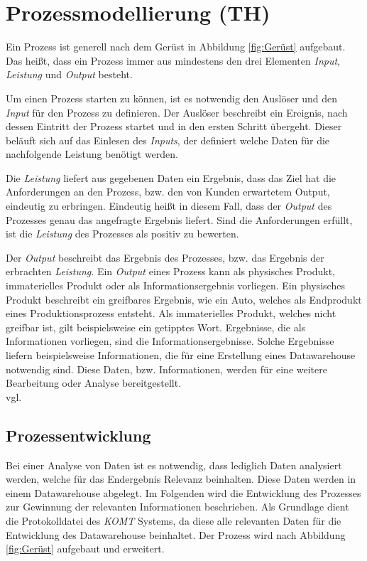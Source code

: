 
\section{Prozessmodellierung (TH)}\label{sec:Prozessmodellierung}

	
	Ein Prozess ist generell nach dem Gerüst in Abbildung \ref{fig:Gerüst} aufgebaut.
	Das heißt, dass ein Prozess immer aus mindestens den drei Elementen \textit{Input}, \textit{Leistung} und \textit{Output} besteht.
	
	Um einen Prozess starten zu können, ist es notwendig den Auslöser und den \textit{Input} für den Prozess zu definieren.
	Der Auslöser beschreibt ein Ereignis, nach dessen Eintritt der Prozess startet und in den ersten Schritt übergeht.
	Dieser beläuft sich auf das Einlesen des \textit{Inputs}, der definiert welche Daten für die nachfolgende Leistung benötigt werden.
	
	Die \textit{Leistung} liefert aus gegebenen Daten ein Ergebnis, dass das Ziel hat die Anforderungen an den Prozess, bzw. den von Kunden erwartetem Output, eindeutig zu erbringen.
	Eindeutig heißt in diesem Fall, dass der \textit{Output} des Prozesses genau das angefragte Ergebnis liefert.
	Sind die Anforderungen erfüllt, ist die \textit{Leistung} des Prozesses als positiv zu bewerten. 

	Der \textit{Output} beschreibt das Ergebnis des Prozesses, bzw. das Ergebnis der erbrachten \textit{Leistung}.
	Ein \textit{Output} eines Prozess kann als physisches Produkt, immaterielles Produkt oder als Informationsergebnis vorliegen.
	Ein physisches Produkt beschreibt ein greifbares Ergebnis, wie ein Auto, welches als Endprodukt eines Produktionsprozess entsteht.
	Als immaterielles Produkt, welches nicht greifbar ist, gilt beispielsweise ein getipptes Wort.
	Ergebnisse, die als Informationen vorliegen, sind die Informationsergebnisse. 
	Solche Ergebnisse liefern beispielsweise Informationen, die für eine Erstellung eines Datawarehouse notwendig sind.
	Diese Daten, bzw. Informationen, werden für eine weitere Bearbeitung oder Analyse bereitgestellt.
	\\vgl. \citep{Knuppertz2012}
		
	
	\subsection{Prozessentwicklung}
 	 	Bei einer Analyse von Daten ist es notwendig, dass lediglich Daten analysiert werden, welche für das Endergebnis Relevanz beinhalten.
 	 	Diese Daten werden in einem Datawarehouse abgelegt. 
 	 	Im Folgenden wird die Entwicklung des Prozesses zur Gewinnung der relevanten Informationen beschrieben. 
 	 	Als Grundlage dient die Protokolldatei des \textit{KOMT} Systems, da diese alle relevanten Daten für die Entwicklung des Datawarehouse beinhaltet. 
 	 	Der Prozess wird nach Abbildung \ref{fig:Gerüst} aufgebaut und erweitert.
 
